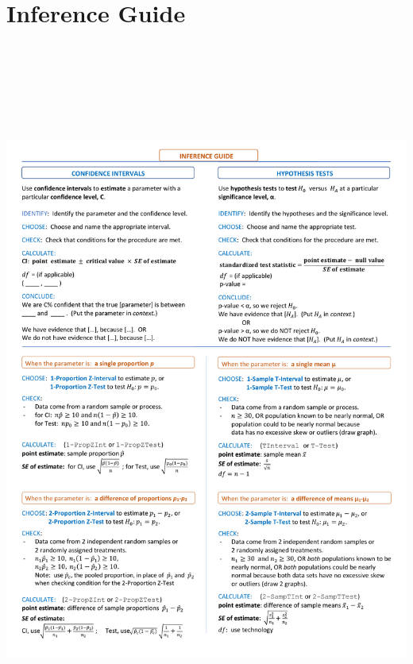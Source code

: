 

\section{Inference Guide}


\begin{center}
\includegraphics[height=9.3in]{extraTeX/inferenceGuide/figures/inference_guide1}
\end{center}

